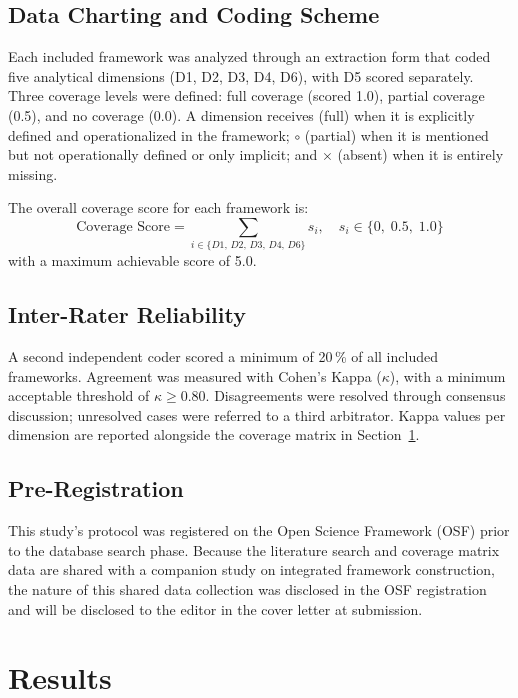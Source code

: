 \documentclass[conference]{IEEEtran}
\newcommand{\fullcov}{\textcolor{fullcol}{\textbf{\checkmark}}}
\newcommand{\partcov}{\textcolor{partcol}{\textbf{$\circ$}}}
\newcommand{\nocov}{\textcolor{nonecol}{\textbf{$\times$}}}
\begin{document}
\subsection{Data Charting and Coding Scheme}

Each included framework was analyzed through an extraction form that
coded five analytical dimensions (D1, D2, D3, D4, D6), with D5
scored separately. Three coverage levels were defined: full coverage
(scored 1.0), partial coverage (0.5), and no coverage (0.0). A
dimension receives \fullcov{} (full) when it is explicitly defined
and operationalized in the framework; \partcov{} (partial) when it
is mentioned but not operationally defined or only implicit; and
\nocov{} (absent) when it is entirely missing.

The overall coverage score for each framework is:
\begin{equation}
  \text{Coverage Score} =
    \sum_{i \in \{D1,\, D2,\, D3,\, D4,\, D6\}} s_i,
  \quad s_i \in \{0,\; 0.5,\; 1.0\}
  \label{eq:score}
\end{equation}
with a maximum achievable score of 5.0.


\subsection{Inter-Rater Reliability}

A second independent coder scored a minimum of 20\,\% of all
included frameworks. Agreement was measured with Cohen's Kappa
($\kappa$), with a minimum acceptable threshold of $\kappa \geq
0.80$. Disagreements were resolved through consensus discussion;
unresolved cases were referred to a third arbitrator. Kappa values
per dimension are reported alongside the coverage matrix in
Section~\ref{sec:results}.


\subsection{Pre-Registration}

This study's protocol was registered on the Open Science Framework
(OSF) prior to the database search phase. Because the literature
search and coverage matrix data are shared with a companion study on
integrated framework construction, the nature of this shared data
collection was disclosed in the OSF registration and will be
disclosed to the editor in the cover letter at submission.


\section{Results}
\label{sec:results}
\end{document}
